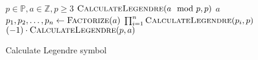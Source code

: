 \documentclass{article}
\begin{document}
\begin{preview}
    \begin{algorithm}[H]
        \begin{algorithmic}
        \Require $p \in \mathbb{P}, a \in \mathbb{Z}, p \geq 3$
				\State \Return $\Call{CalculateLegendre}{a \mod p, p}$ 
				\State \Return $a$ 
			 
					\State {}
				\Else
					\State {}
				\EndIf	{}
			 
					\State {}
				\Else
					\State {}
				\EndIf {}
			 
				\State $p_1, p_2, \dots, p_n \gets \Call{Factorize}{a}$
				\State \Return $\prod_{i=1}^n \Call{CalculateLegendre}{p_i, p}$ 
			\Else {}
				\State \Return $(-1) \cdot \Call{CalculateLegendre}{p, a}$
			\EndIf
		\EndProcedure
        \end{algorithmic}
    \caption{Calculate Legendre symbol}
    \label{alg:calculateLegendreSymbol}
    \end{algorithm}
\end{preview}
\end{document}
